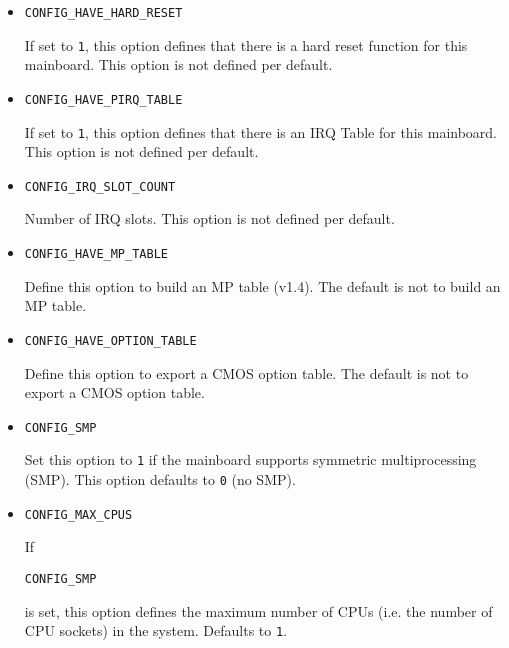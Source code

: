 \documentclass[titlepage,12pt]{article}
\begin{document}
\begin{itemize}

\item \begin{verbatim}CONFIG_HAVE_HARD_RESET\end{verbatim}

If set to \texttt{1}, this option defines that there is a hard reset
function for this mainboard.  This option is not defined per default.

\item \begin{verbatim}CONFIG_HAVE_PIRQ_TABLE\end{verbatim}

If set to \texttt{1}, this option defines that there is an IRQ Table for
this mainboard. This option is not defined per default.

\item \begin{verbatim}CONFIG_IRQ_SLOT_COUNT\end{verbatim}

Number of IRQ slots. This option is not defined per default.

\item \begin{verbatim}CONFIG_HAVE_MP_TABLE\end{verbatim}

Define this option to build an MP table (v1.4). The default is not to
build an MP table.

\item \begin{verbatim}CONFIG_HAVE_OPTION_TABLE\end{verbatim}

Define this option to export a CMOS option table. The default is not to
export a CMOS option table.

\item \begin{verbatim}CONFIG_SMP\end{verbatim}

Set this option to \texttt{1} if the mainboard supports symmetric
multiprocessing (SMP). This option defaults to \texttt{0} (no SMP).

\item \begin{verbatim}CONFIG_MAX_CPUS\end{verbatim}

If \begin{verbatim}CONFIG_SMP\end{verbatim} is set, this option defines
the maximum number of CPUs (i.e. the number of CPU sockets) in the
system. Defaults to \texttt{1}.


\end{itemize}
\end{document}

